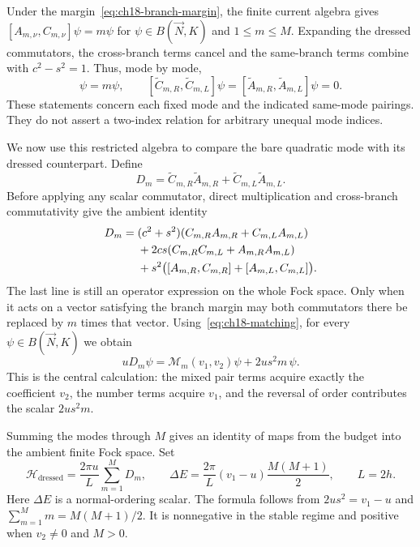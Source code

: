 Under the margin~\eqref{eq:ch18-branch-margin}, the finite current algebra gives $[A_{m,\nu},C_{m,\nu}]\psi=m\psi$ for $\psi\in B(\vec N,K)$ and $1\leq m\leq M$. Expanding the dressed commutators, the cross-branch terms cancel and the same-branch terms combine with $c^2-s^2=1$. Thus, mode by mode,
\begin{equation}
  [\widetilde A_{m,\nu},\widetilde C_{m,\nu}]\psi=m\psi,
  \qquad
  [\widetilde C_{m,R},\widetilde C_{m,L}]\psi
  =[\widetilde A_{m,R},\widetilde A_{m,L}]\psi=0.
  \label{eq:ch18-budget-ccr}
\end{equation}
\label{thm:bogoliubov_ccr_budget}
These statements concern each fixed mode and the indicated same-mode pairings. They do not assert a two-index relation for arbitrary unequal mode indices.

We now use this restricted algebra to compare the bare quadratic mode with its dressed counterpart. Define
\begin{equation}
  D_m=\widetilde C_{m,R}\widetilde A_{m,R}
      +\widetilde C_{m,L}\widetilde A_{m,L}.
\end{equation}
Before applying any scalar commutator, direct multiplication and cross-branch commutativity give the ambient identity
\begin{align}
 D_m={}&(c^2+s^2)(C_{m,R}A_{m,R}+C_{m,L}A_{m,L})\notag\\
 &+2cs(C_{m,R}C_{m,L}+A_{m,R}A_{m,L})\notag\\
 &+s^2\bigl([A_{m,R},C_{m,R}]+[A_{m,L},C_{m,L}]\bigr).
 \label{eq:ch18-product-expansion}
\end{align}
The last line is still an operator expression on the whole Fock space. Only when it acts on a vector satisfying the branch margin may both commutators there be replaced by $m$ times that vector. Using~\eqref{eq:ch18-matching}, for every $\psi\in B(\vec N,K)$ we obtain
\begin{equation}
  uD_m\psi=\mathcal M_m(v_1,v_2)\psi+2us^2m\,\psi.
  \label{eq:ch18-mode-diagonalization}
\end{equation}
This is the central calculation: the mixed pair terms acquire exactly the coefficient $v_2$, the number terms acquire $v_1$, and the reversal of order contributes the scalar $2us^2m$.

Summing the modes through $M$ gives an identity of maps from the budget into the ambient finite Fock space. Set
\begin{equation}
  \mathcal H_{\mathrm{dressed}}=\frac{2\pi u}{L}
    \sum_{m=1}^M D_m,
  \qquad
  \Delta E=\frac{2\pi}{L}(v_1-u)\frac{M(M+1)}{2},
  \qquad L=2h.
  \label{eq:ch18-dressed-hamiltonian}
\end{equation}
Here $\Delta E$ is a normal-ordering scalar. The formula follows from $2us^2=v_1-u$ and $\sum_{m=1}^M m=M(M+1)/2$. It is nonnegative in the stable regime and positive when $v_2\ne0$ and $M>0$.

